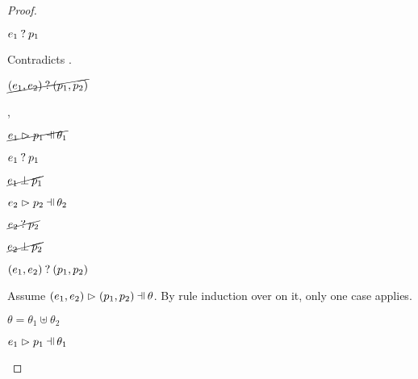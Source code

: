 \begin{proof}
\begin{byCases}
\begin{byCases}
\begin{byCases}
\begin{byCases}
            \item[\text{(\ref{rule:MMPair})}]
                \begin{pfsteps*}
                \item $e_1 \mathbin{?} p_1$ 
                \end{pfsteps*}
                Contradicts .
            \end{byCases}
            \begin{pfsteps*}
            \item $\cancel{(e_1 , e_2) \mathbin{?} (p_1 , p_2)}$ 
            \end{pfsteps*}
        \item[\hmaymatch{e_1}{p_1},\hpatmatch{e_2}{p_2}{\theta_2}]
            \begin{pfsteps*}
            \item $\cancel{\hpatmatch{e_1}{p_1}{\theta_1}}$  
            \item $e_1 \mathbin{?} p_1$  
            \item $\cancel{e_1 \mathbin{\bot} p_1}$  
            \item $\hpatmatch{e_2}{p_2}{\theta_2}$  
            \item $\cancel{e_2 \mathbin{?} p_2}$  
            \item $\cancel{e_2 \mathbin{\bot} p_2}$  
            \item $(e_1 , e_2) \mathbin{?} (p_1 , p_2)$ 
            \end{pfsteps*}
            Assume $\hpatmatch{\hpair{e_1}{e_2}}{\hpair{p_1}{p_2}}{\theta}$. By rule induction over  on it, only one case applies.
            \begin{byCases}
            \item[\text{(\ref{rule:MPair})}]
                \begin{pfsteps*}
                \item $\theta=\theta_1\uplus\theta_2$
                \item $\hpatmatch{e_1}{p_1}{\theta_1}$ 

\end{pfsteps*}
\end{byCases}
\end{byCases}
\end{byCases}
\end{byCases}
\end{proof}
